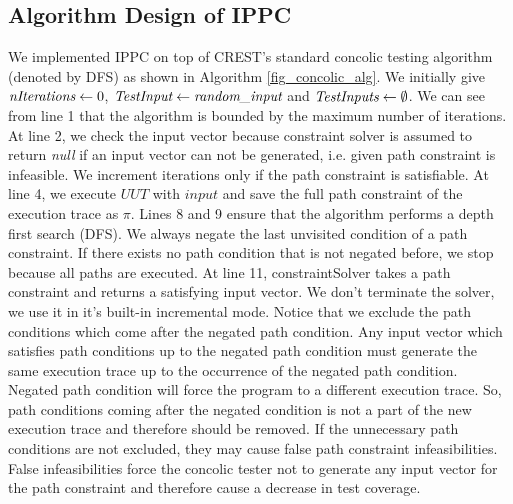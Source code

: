 \documentclass[EPiCempty]{easychair}
\begin{document}
\subsection{Algorithm Design of IPPC}
\label{subsec:ippc_alg_design}

We implemented IPPC on top of CREST's standard concolic testing algorithm (denoted by DFS) as shown in Algorithm \ref{fig_concolic_alg}. We initially give $\emph{nIterations} \leftarrow 0$, $\emph{TestInput} \leftarrow \emph{random\_input}$ and $\emph{TestInputs} \leftarrow \emptyset$. We can see from line 1 that the algorithm is bounded by the maximum number of iterations. At line 2, we check the input vector because constraint solver is assumed to return \emph{null} if an input vector can not be generated, i.e. given path constraint is infeasible. We increment iterations only if the path constraint is satisfiable. At line 4, we execute $UUT$ with $input$ and save the full path constraint of the execution trace as $\pi$. Lines 8 and 9 ensure that the algorithm performs a depth first search (DFS). We always negate the last unvisited condition of a path constraint. If there exists no path condition that is not negated before, we stop because all paths are executed. At line 11, constraintSolver takes a path constraint and returns a satisfying input vector. We don't terminate the solver, we use it in it's built-in incremental mode. Notice that we exclude the path conditions which come after the negated path condition. Any input vector which satisfies path conditions up to the negated path condition must generate the same execution trace up to the occurrence of the negated path condition. Negated path condition will force the program to a different execution trace. So, path conditions coming after the negated condition is not a part of the new execution trace and therefore should be removed. If the unnecessary path conditions are not excluded, they may cause false path constraint infeasibilities. False infeasibilities force the concolic tester not to generate any input vector for the path constraint and therefore cause a decrease in test coverage.
\end{document}
